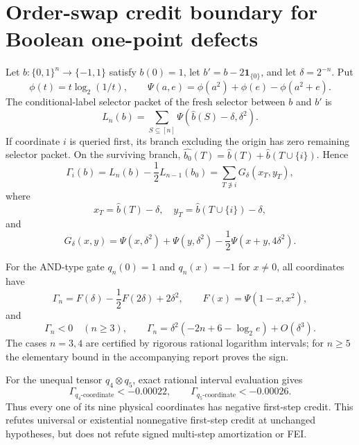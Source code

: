 \section*{Order-swap credit boundary for Boolean one-point defects}

Let $b:\{0,1\}^n\to\{-1,1\}$ satisfy $b(0)=1$, let
$b'=b-2\mathbf 1_{\{0\}}$, and let $\delta=2^{-n}$.  Put
\[
 \phi(t)=t\log_2(1/t),\qquad
 \Psi(a,e)=\phi(a^2)+\phi(e)-\phi(a^2+e).
\]
The conditional-label selector packet of the fresh selector between $b$ and
$b'$ is
\[
 L_n(b)=\sum_{S\subseteq[n]}
 \Psi(\widehat b(S)-\delta,\delta^2).
\]
If coordinate $i$ is queried first, its branch excluding the origin has zero
remaining selector packet.  On the surviving branch,
$\widehat{b_0}(T)=\widehat b(T)+\widehat b(T\cup\{i\})$.  Hence
\[
 \Gamma_i(b)=L_n(b)-\frac12L_{n-1}(b_0)
 =\sum_{T\not\ni i}G_\delta(x_T,y_T),
\]
where
\[
 x_T=\widehat b(T)-\delta,\quad
 y_T=\widehat b(T\cup\{i\})-\delta,
\]
and
\[
 G_\delta(x,y)=\Psi(x,\delta^2)+\Psi(y,\delta^2)
 -\frac12\Psi(x+y,4\delta^2).
\]

For the AND-type gate $q_n(0)=1$ and $q_n(x)=-1$ for $x\ne0$, all
coordinates have
\[
 \Gamma_n=F(\delta)-\frac12F(2\delta)+2\delta^2,
 \qquad F(x)=\Psi(1-x,x^2),
\]
and
\[
 \Gamma_n<0\quad(n\ge3),\qquad
 \Gamma_n=\delta^2(-2n+6-\log_2e)+O(\delta^3).
\]
The cases $n=3,4$ are certified by rigorous rational logarithm intervals;
for $n\ge5$ the elementary bound in the accompanying report proves the
sign.

For the unequal tensor $q_4\otimes q_5$, exact rational interval evaluation
gives
\[
 \Gamma_{q_4\text{-coordinate}}<-0.00022,\qquad
 \Gamma_{q_5\text{-coordinate}}<-0.00026.
\]
Thus every one of its nine physical coordinates has negative first-step
credit.  This refutes universal or existential nonnegative first-step credit
at unchanged hypotheses, but does not refute signed multi-step amortization
or FEI.
